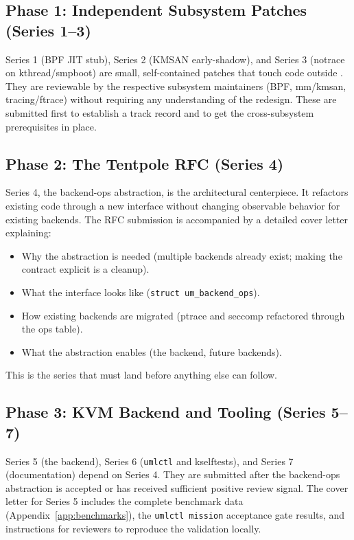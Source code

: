 \subsection{Phase 1: Independent Subsystem Patches (Series 1--3)}

Series 1 (BPF JIT stub), Series 2 (KMSAN early-shadow), and
Series 3 (notrace on kthread/smpboot) are small, self-contained
patches that touch code outside .  They are
reviewable by the respective subsystem maintainers (BPF, mm/kmsan,
tracing/ftrace) without requiring any understanding of the \UML{}
redesign.  These are submitted first to establish a track record and
to get the cross-subsystem prerequisites in place.

\subsection{Phase 2: The Tentpole RFC (Series 4)}

Series 4, the backend-ops abstraction, is the architectural
centerpiece.  It refactors existing code through a new interface
without changing observable behavior for existing backends.  The RFC
submission is accompanied by a detailed cover letter explaining:

\begin{itemize}[leftmargin=2em]
  \item Why the abstraction is needed (multiple backends already exist;
    making the contract explicit is a cleanup).
  \item What the interface looks like (\texttt{struct um\_backend\_ops}).
  \item How existing backends are migrated (ptrace and seccomp
    refactored through the ops table).
  \item What the abstraction enables (the \KVMvTwo{} backend, future
    backends).
\end{itemize}

\noindent
This is the series that must land before anything else can follow.

\subsection{Phase 3: KVM Backend and Tooling (Series 5--7)}

Series 5 (the \KVMvTwo{} backend), Series 6 (\texttt{umlctl} and
kselftests), and Series 7 (documentation) depend on Series 4.  They
are submitted after the backend-ops abstraction is accepted or has
received sufficient positive review signal.  The cover letter for
Series 5 includes the complete benchmark data
(Appendix~\ref{app:benchmarks}), the \texttt{umlctl mission}
acceptance gate results, and instructions for reviewers to reproduce
the validation locally.

